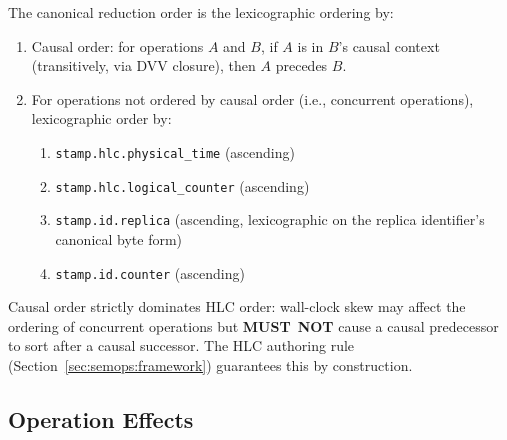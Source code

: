 \documentclass[11pt,letterpaper]{report}
\newcounter{requirement}[chapter]
\newcommand{\MUSTNOT}{\textbf{MUST}\nobreak\ \textbf{NOT}}
\begin{document}
\begin{requirement}
  \label{req:semops:canonical-reduction-order}
  The canonical reduction order is the lexicographic ordering by:

  \begin{enumerate}
    \item Causal order: for operations $A$ and $B$, if $A$ is in
      $B$'s causal context (transitively, via DVV closure), then
      $A$ precedes $B$.
    \item For operations not ordered by causal order (i.e.,
      concurrent operations), lexicographic order by:
      \begin{enumerate}
        \item \texttt{stamp.hlc.physical\_time} (ascending)
        \item \texttt{stamp.hlc.logical\_counter} (ascending)
        \item \texttt{stamp.id.replica} (ascending, lexicographic on
          the replica identifier's canonical byte form)
        \item \texttt{stamp.id.counter} (ascending)
      \end{enumerate}
  \end{enumerate}

  Causal order strictly dominates HLC order: wall-clock skew may
  affect the ordering of concurrent operations but \MUSTNOT{} cause
  a causal predecessor to sort after a causal successor. The HLC
  authoring rule (Section~\ref{sec:semops:framework}) guarantees this
  by construction.
\end{requirement}

\subsection{Operation Effects}
\end{document}
